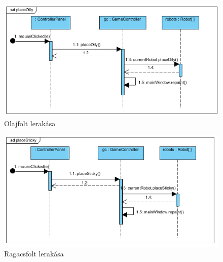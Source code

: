 \begin{figure}[h]
	\begin{center}
		\includegraphics[width=14cm]{chapters/chapter11/placeoily.png}
		\caption{Olajfolt lerakása}
		\label{fig:Grafika}
	\end{center}
\end{figure}

\begin{figure}[h]
	\begin{center}
		\includegraphics[width=14cm]{chapters/chapter11/placesticky.png}
		\caption{Ragacsfolt lerakása}
		\label{fig:Grafika}
	\end{center}
\end{figure}
\clearpage

